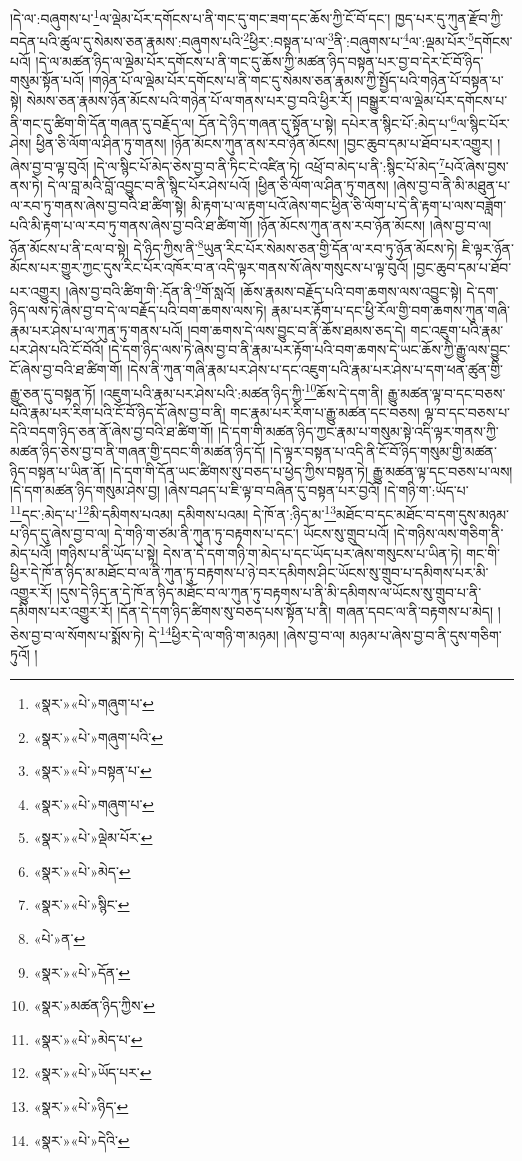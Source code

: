 །དེ་ལ་:བཞུགས་པ་\footnote{«སྣར་»«པེ་»གཞུག་པ་}ལ་ལྡེམ་པོར་དགོངས་པ་ནི་གང་དུ་གང་ཟག་དང་ཆོས་ཀྱི་ངོ་བོ་དང་། ཁྱད་པར་དུ་ཀུན་རྫོབ་ཀྱི་བདེན་པའི་ཚུལ་དུ་སེམས་ཅན་རྣམས་:བཞུགས་པའི་\footnote{«སྣར་»«པེ་»གཞུག་པའི་}ཕྱིར་:བསྟན་པ་ལ་\footnote{«སྣར་»«པེ་»བསྟན་པ་}ནི་:བཞུགས་པ་\footnote{«སྣར་»«པེ་»གཞུག་པ་}ལ་:ལྡམ་པོར་\footnote{«སྣར་»«པེ་»ལྡེམ་པོར་}དགོངས་པའོ། །དེ་ལ་མཚན་ཉིད་ལ་ལྡེམ་པོར་དགོངས་པ་ནི་གང་དུ་ཆོས་ཀྱི་མཚན་ཉིད་བསྟན་པར་བྱ་བ་དེར་ངོ་བོ་ཉིད་གསུམ་སྟོན་པའོ། །གཉེན་པོ་ལ་ལྡེམ་པོར་དགོངས་པ་ནི་གང་དུ་སེམས་ཅན་རྣམས་ཀྱི་སྤྱོད་པའི་གཉེན་པོ་བསྟན་པ་སྟེ། སེམས་ཅན་རྣམས་ཉོན་མོངས་པའི་གཉེན་པོ་ལ་གནས་པར་བྱ་བའི་ཕྱིར་རོ། །བསྒྱུར་བ་ལ་ལྡེམ་པོར་དགོངས་པ་ནི་གང་དུ་ཚིག་གི་དོན་གཞན་དུ་བརྗོད་ལ། དོན་དེ་ཉིད་གཞན་དུ་སྟོན་པ་སྟེ། དཔེར་ན་སྙིང་པོ་:མེད་པ་\footnote{«སྣར་»«པེ་»མེད་}ལ་སྙིང་པོར་ཤེས། ཕྱིན་ཅི་ལོག་ལ་ཤིན་ཏུ་གནས། །ཉོན་མོངས་ཀུན་ནས་རབ་ཉོན་མོངས། །བྱང་ཆུབ་དམ་པ་ཐོབ་པར་འགྱུར། །ཞེས་བྱ་བ་ལྟ་བུའོ། །དེ་ལ་སྙིང་པོ་མེད་ཅེས་བྱ་བ་ནི་ཏིང་ངེ་འཛིན་ཏེ། འཕྲོ་བ་མེད་པ་ནི་:སྙིང་པོ་མེད་\footnote{«སྣར་»«པེ་»སྙིང་}པའོ་ཞེས་བྱས་ནས་ཏེ། དེ་ལ་བླ་མའི་བློ་འབྱུང་བ་ནི་སྙིང་པོར་ཤེས་པའོ། །ཕྱིན་ཅི་ལོག་ལ་ཤིན་ཏུ་གནས། །ཞེས་བྱ་བ་ནི་མི་མཐུན་པ་ལ་རབ་ཏུ་གནས་ཞེས་བྱ་བའི་ཐ་ཚིག་སྟེ། མི་རྟག་པ་ལ་རྟག་པའོ་ཞེས་གང་ཕྱིན་ཅི་ལོག་པ་དེ་ནི་རྟག་པ་ལས་བཟློག་པའི་མི་རྟག་པ་ལ་རབ་ཏུ་གནས་ཞེས་བྱ་བའི་ཐ་ཚིག་གོ། །ཉོན་མོངས་ཀུན་ནས་རབ་ཉོན་མོངས། །ཞེས་བྱ་བ་ལ། ཉོན་མོངས་པ་ནི་ངལ་བ་སྟེ། དེ་ཉིད་ཀྱིས་ནི་\footnote{«པེ་»ན་}ཡུན་རིང་པོར་སེམས་ཅན་གྱི་དོན་ལ་རབ་ཏུ་ཉོན་མོངས་ཏེ། ཇི་ལྟར་ཉོན་མོངས་པར་གྱུར་ཀྱང་དུས་རིང་པོར་འཁོར་བ་ན་འདི་ལྟར་གནས་སོ་ཞེས་གསུངས་པ་ལྟ་བུའོ། །བྱང་ཆུབ་དམ་པ་ཐོབ་པར་འགྱུར། །ཞེས་བྱ་བའི་ཚིག་གི་:དོན་ནི་\footnote{«སྣར་»«པེ་»དོན་}གོ་སླའོ། །ཆོས་རྣམས་བརྗོད་པའི་བག་ཆགས་ལས་འབྱུང་སྟེ། དེ་དག་ཉིད་ལས་ཏེ་ཞེས་བྱ་བ་དེ་ལ་བརྗོད་པའི་བག་ཆགས་ལས་ཏེ། རྣམ་པར་རྟོག་པ་དང་ཕྱི་རོལ་གྱི་བག་ཆགས་ཀུན་གཞི་རྣམ་པར་ཤེས་པ་ལ་ཀུན་ཏུ་གནས་པའོ། །བག་ཆགས་དེ་ལས་བྱུང་བ་ནི་ཆོས་ཐམས་ཅད་དེ། གང་འཇུག་པའི་རྣམ་པར་ཤེས་པའི་ངོ་བོའོ། །དེ་དག་ཉིད་ལས་ཏེ་ཞེས་བྱ་བ་ནི་རྣམ་པར་རྟོག་པའི་བག་ཆགས་དེ་ཡང་ཆོས་ཀྱི་རྒྱུ་ལས་བྱུང་ངོ་ཞེས་བྱ་བའི་ཐ་ཚིག་གོ། །དེས་ནི་ཀུན་གཞི་རྣམ་པར་ཤེས་པ་དང་འཇུག་པའི་རྣམ་པར་ཤེས་པ་དག་ཕན་ཚུན་གྱི་རྒྱུ་ཅན་དུ་བསྟན་ཏོ། །འཇུག་པའི་རྣམ་པར་ཤེས་པའི་:མཚན་ཉིད་ཀྱི་\footnote{«སྣར་»མཚན་ཉིད་ཀྱིས་}ཆོས་དེ་དག་ནི། རྒྱུ་མཚན་ལྟ་བ་དང་བཅས་པའི་རྣམ་པར་རིག་པའི་ངོ་བོ་ཉིད་དོ་ཞེས་བྱ་བ་ནི། གང་རྣམ་པར་རིག་པ་རྒྱུ་མཚན་དང་བཅས། ལྟ་བ་དང་བཅས་པ་དེའི་བདག་ཉིད་ཅན་ནོ་ཞེས་བྱ་བའི་ཐ་ཚིག་གོ། །དེ་དག་གི་མཚན་ཉིད་ཀྱང་རྣམ་པ་གསུམ་སྟེ་འདི་ལྟར་གནས་ཀྱི་མཚན་ཉིད་ཅེས་བྱ་བ་ནི་གཞན་གྱི་དབང་གི་མཚན་ཉིད་དོ། །དེ་ལྟར་བསྟན་པ་འདི་ནི་ངོ་བོ་ཉིད་གསུམ་གྱི་མཚན་ཉིད་བསྟན་པ་ཡིན་ནོ། །དེ་དག་གི་དོན་ཡང་ཚིགས་སུ་བཅད་པ་ཕྱེད་ཀྱིས་བསྟན་ཏེ། རྒྱུ་མཚན་ལྟ་དང་བཅས་པ་ལས། །དེ་དག་མཚན་ཉིད་གསུམ་ཤེས་བྱ། །ཞེས་བཤད་པ་ཇི་ལྟ་བ་བཞིན་དུ་བསྟན་པར་བྱའོ། །དེ་གཉི་ག་:ཡོད་པ་\footnote{«སྣར་»«པེ་»མེད་པ་}དང་:མེད་པ་\footnote{«སྣར་»«པེ་»ཡོད་པར་}མི་དམིགས་པའམ། དམིགས་པའམ། དེ་ཁོ་ན་:ཉིད་མ་\footnote{«སྣར་»«པེ་»ཉིད་}མཐོང་བ་དང་མཐོང་བ་དག་དུས་མཉམ་པ་ཉིད་དུ་ཞེས་བྱ་བ་ལ། དེ་གཉི་ག་ཙམ་ནི་ཀུན་ཏུ་བརྟགས་པ་དང་། ཡོངས་སུ་གྲུབ་པའོ། །དེ་གཉིས་ལས་གཅིག་ནི་མེད་པའོ། །གཉིས་པ་ནི་ཡོད་པ་སྟེ། དེས་ན་དེ་དག་གཉི་ག་མེད་པ་དང་ཡོད་པར་ཞེས་གསུངས་པ་ཡིན་ཏེ། གང་གི་ཕྱིར་དེ་ཁོ་ན་ཉིད་མ་མཐོང་བ་ལ་ནི་ཀུན་ཏུ་བརྟགས་པ་ཉེ་བར་དམིགས་ཤིང་ཡོངས་སུ་གྲུབ་པ་དམིགས་པར་མི་འགྱུར་རོ། །དུས་དེ་ཉིད་ན་དེ་ཁོ་ན་ཉིད་མཐོང་བ་ལ་ཀུན་ཏུ་བརྟགས་པ་ནི་མི་དམིགས་ལ་ཡོངས་སུ་གྲུབ་པ་ནི་དམིགས་པར་འགྱུར་རོ། །དོན་དེ་དག་ཉིད་ཚིགས་སུ་བཅད་པས་སྟོན་པ་ནི། གཞན་དབང་ལ་ནི་བརྟགས་པ་མེད། །ཅེས་བྱ་བ་ལ་སོགས་པ་སྨོས་ཏེ། དེ་\footnote{«སྣར་»«པེ་»དེའི་}ཕྱིར་དེ་ལ་གཉི་ག་མཉམ། །ཞེས་བྱ་བ་ལ། མཉམ་པ་ཞེས་བྱ་བ་ནི་དུས་གཅིག་ཏུའོ། །
